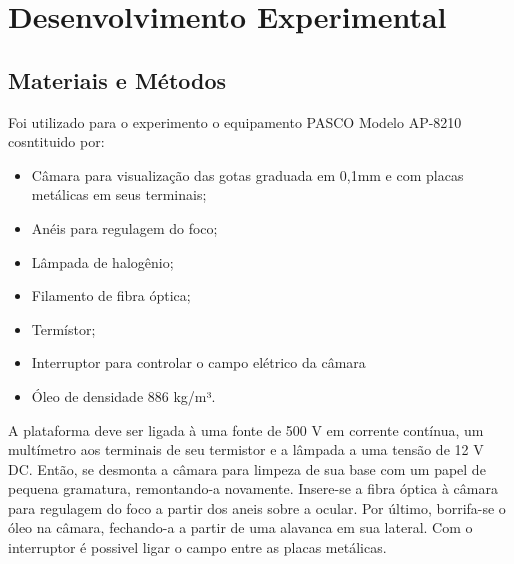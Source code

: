 \section{Desenvolvimento Experimental}
\subsection{Materiais e Métodos}
Foi utilizado para o experimento o equipamento PASCO Modelo AP-8210 cosntituido por: 
\begin{itemize}
	\item Câmara  para visualização das gotas graduada em 0,1mm e com placas metálicas em seus terminais;
	\item Anéis para regulagem do foco;
	\item Lâmpada de halogênio;
	\item Filamento de fibra óptica;
	\item Termístor;
	\item Interruptor para controlar o campo elétrico da câmara
	\item Óleo de densidade 886 kg/m³.
\end{itemize}

A plataforma deve ser ligada à uma fonte de 500 V em corrente contínua, um multímetro aos terminais de seu termistor e a lâmpada a uma tensão de 12 V DC. Então, se desmonta a câmara para limpeza de sua base com um papel de pequena gramatura, remontando-a novamente. Insere-se a fibra óptica à câmara para regulagem do foco a partir dos aneis sobre a ocular. Por último, borrifa-se o óleo na câmara, fechando-a a partir de uma alavanca em sua lateral. Com o interruptor é possivel ligar o campo entre as placas metálicas.      

